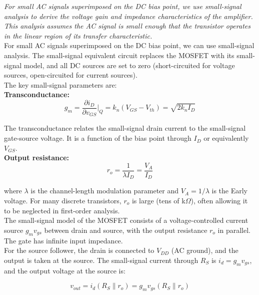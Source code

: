 \documentclass[10pt]{article}
\begin{document}
\textit{For small AC signals superimposed on the DC bias point, we use small-signal analysis to derive the voltage gain and impedance characteristics of the amplifier. This analysis assumes the AC signal is small enough that the transistor operates in the linear region of its transfer characteristic.} \\

For small AC signals superimposed on the DC bias point, we can use small-signal analysis. The small-signal equivalent circuit replaces the MOSFET with its small-signal model, and all DC sources are set to zero (short-circuited for voltage sources, open-circuited for current sources).\\

The key small-signal parameters are: \\

\textbf{Transconductance: }
\begin{equation}
    g_m = \frac{\partial i_D}{\partial v_{GS}}\bigg|_{Q} = k_n (V_{GS} - V_{th}) = \sqrt{2 k_n I_D}
    \label{eq:gm}
\end{equation}

The transconductance relates the small-signal drain current to the small-signal gate-source voltage.  It is a function of the bias point through $I_D$ or equivalently $V_{GS}$. \\

\textbf{Output resistance:}
\begin{equation}
    r_o = \frac{1}{\lambda I_D} = \frac{V_A}{I_D}
    \label{eq:ro}
\end{equation}

where $\lambda$ is the channel-length modulation parameter and $V_A = 1/\lambda$ is the Early voltage.  For many discrete transistors, $r_o$ is large (tens of k$\Omega$), often allowing it to be neglected in first-order analysis. \\

The small-signal model of the MOSFET consists of a voltage-controlled current source $g_m v_{gs}$ between drain and source, with the output resistance $r_o$ in parallel.  The gate has infinite input impedance. \\

For the source follower, the drain is connected to $V_{DD}$ (AC ground), and the output is taken at the source. The small-signal current through $R_S$ is $i_d = g_m v_{gs}$, and the output voltage at the source is:

\begin{equation}
    v_{out} = i_d (R_S \parallel r_o) = g_m v_{gs} (R_S \parallel r_o)
    \label{eq:vout_ss}
\end{equation}
\end{document}
